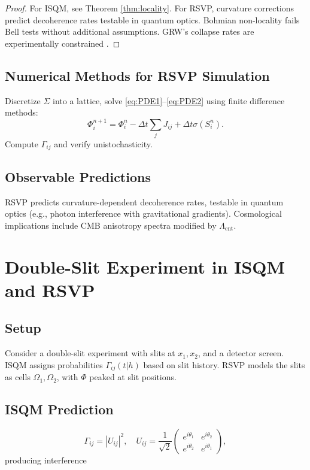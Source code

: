 \documentclass[12pt]{article}
\begin{document}
\begin{proof}
For ISQM, see Theorem \ref{thm:locality}. For RSVP, curvature corrections predict decoherence rates testable in quantum optics. Bohmian non-locality fails Bell tests without additional assumptions. GRW’s collapse rates are experimentally constrained \citep{Ghirardi1986}.
\end{proof}

\subsection{Numerical Methods for RSVP Simulation}

Discretize \(\Sigma\) into a lattice, solve \eqref{eq:PDE1}--\eqref{eq:PDE2} using finite difference methods:
\[
\Phi_i^{n+1} = \Phi_i^n - \Delta t \sum_j J_{ij} + \Delta t \sigma(S_i^n).
\]
Compute \(\Gamma_{ij}\) and verify unistochasticity.

\subsection{Observable Predictions}

RSVP predicts curvature-dependent decoherence rates, testable in quantum optics (e.g., photon interference with gravitational gradients). Cosmological implications include CMB anisotropy spectra modified by \(\Lambda_{\mathrm{ent}}\).

\section{Double-Slit Experiment in ISQM and RSVP}

\subsection{Setup}

Consider a double-slit experiment with slits at \(x_1, x_2\), and a detector screen. ISQM assigns probabilities \(\Gamma_{ij}(t | h)\) based on slit history. RSVP models the slits as cells \(\Omega_1, \Omega_2\), with \(\Phi\) peaked at slit positions.

\subsection{ISQM Prediction}

\[
\Gamma_{ij} = |U_{ij}|^2, \quad U_{ij} = \frac{1}{\sqrt{2}} \begin{pmatrix} e^{i \theta_1} & e^{i \theta_2} \\ e^{i \theta_2} & e^{i \theta_1} \end{pmatrix},
\]
producing interference
\end{document}
